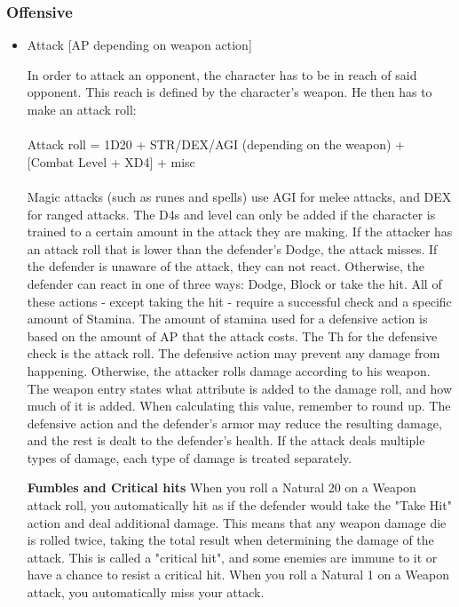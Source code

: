 \subsubsection{Offensive}\label{subsubsec:offensiveCombatActions}
\begin{itemize}
\item Attack [AP depending on weapon action]

In order to attack an opponent, the character has to be in reach of said opponent.
This reach is defined by the character's weapon.
He then has to make an attack roll:\\
\\
Attack roll = 1D20 + STR/DEX/AGI (depending on the weapon) + [Combat Level + XD4] + misc
\\
\\
Magic attacks (such as runes and spells) use AGI for melee attacks, and DEX for ranged attacks.
The D4s and level can only be added if the character is trained to a certain amount in the attack they are making.
If the attacker has an attack roll that is lower than the defender's Dodge, the attack misses.
If the defender is unaware of the attack, they can not react.
Otherwise, the defender can react in one of three ways: Dodge, Block or take the hit.
All of these actions - except taking the hit - require a successful check and a specific amount of Stamina.
The amount of stamina used for a defensive action is based on the amount of  AP that the attack costs.
The Th for the defensive check is the attack roll.
The defensive action may prevent any damage from happening.
Otherwise, the attacker rolls damage according to his weapon.
The weapon entry states what attribute is added to the damage roll, and how much of it is added.
When calculating this value, remember to round up.
The defensive action and the defender's armor may reduce the resulting damage, and the rest is dealt to the defender's health.
If the attack deals multiple types of damage, each type of damage is treated separately.


\textbf{Fumbles and Critical hits}
When you roll a Natural 20 on a Weapon attack roll, you automatically hit as if the defender would take the "Take Hit" action and deal additional damage.
This means that any weapon damage die is rolled twice, taking the total result when determining the damage of the attack.
This is called a "critical hit", and some enemies are immune to it or have a chance to resist a critical hit.
When you roll a Natural 1 on a Weapon attack, you automatically miss your attack.


\end{itemize}
